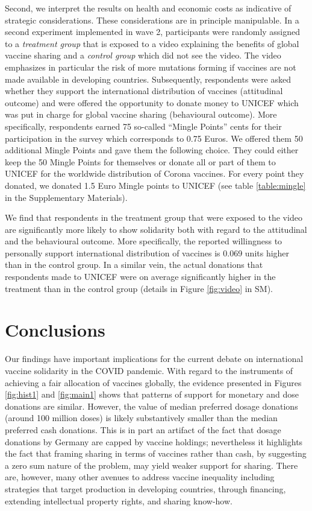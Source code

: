 \documentclass[12pt,oneside]{article}
\begin{document}
Second, we interpret the results on health and economic costs as indicative of strategic considerations. These considerations are in principle manipulable. In  a second experiment implemented in wave 2, participants were randomly assigned to a \emph{treatment group} that is exposed to a video explaining the benefits of global vaccine sharing and a \emph{control group} which did not see the video. The video emphasizes in particular the risk of more mutations forming if vaccines are not made available in developing countries. Subsequently, respondents were asked whether they support the international distribution of vaccines (attitudinal outcome) and were offered the opportunity to donate money to UNICEF which was put in charge for global vaccine sharing (behavioural outcome). More specifically, respondents earned 75 so-called ``Mingle Points'' cents for their participation in the survey which corresponds to 0.75 Euros. We offered them  50 additional Mingle Points and gave them the following choice. They could either keep the 50 Mingle Points for themselves  or donate all or part of them to UNICEF for the worldwide distribution of Corona vaccines. For every point they donated, we donated 1.5 Euro Mingle points to UNICEF (see table \ref{table:mingle} in the Supplementary Materials). 



We find that respondents in the treatment group that were exposed to the video are significantly more likely to show solidarity both with regard to the attitudinal and the behavioural outcome. More specifically, the reported willingness to personally support international distribution of vaccines is 0.069 units higher than in the control group. In a similar vein, the actual donations that respondents made to UNICEF were on average significantly higher in the treatment than in the control group (details in Figure \ref{fig:video} in SM). 





\section*{Conclusions}


Our findings have important implications for the current debate on international vaccine solidarity in the COVID pandemic. With regard to the instruments of achieving a fair allocation of vaccines globally, the evidence presented in Figures \ref{fig:hist1} and \ref{fig:main1} shows that patterns of support for monetary and dose donations are similar. However, the value of median preferred dosage donations (around 100 million doses) is likely substantively smaller than the median preferred cash donations. This is in part an artifact of the fact that dosage donations by Germany are capped by vaccine holdings; nevertheless it highlights the fact that framing sharing in terms of vaccines rather than cash, by suggesting a zero sum nature of the problem, may yield weaker support for sharing. There are, however, many other avenues to address vaccine inequality including strategies that target production in developing countries, through financing, extending intellectual property rights, and sharing know-how.
\end{document}
